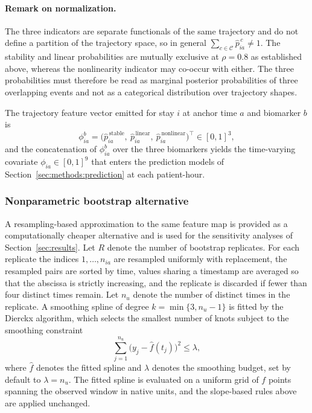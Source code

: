 \paragraph{Remark on normalization.} The three indicators are separate functionals of the same trajectory and do not define a partition of the trajectory space, so in general $\sum_{c\in\mathcal{C}}\hat{p}^{\,c}_{ia}\ne1$. The stability and linear probabilities are mutually exclusive at $\rho=0.8$ as established above, whereas the nonlinearity indicator may co-occur with either. The three probabilities must therefore be read as marginal posterior probabilities of three overlapping events and not as a categorical distribution over trajectory shapes.

The trajectory feature vector emitted for stay $i$ at anchor time $a$ and biomarker $b$ is
$$\phi^b_{ia}=\bigl(\hat{p}^{\,\mathrm{stable}}_{ia},\ \hat{p}^{\,\mathrm{linear}}_{ia},\ \hat{p}^{\,\mathrm{nonlinear}}_{ia}\bigr)^{\top}\in[0,1]^3,$$
and the concatenation of $\phi^b_{ia}$ over the three biomarkers yields the time-varying covariate $\phi_{ia}\in[0,1]^{9}$ that enters the prediction models of Section~\ref{sec:methods:prediction} at each patient-hour.

\subsubsection{Nonparametric bootstrap alternative}
\label{sec:methods:bootstrap}

A resampling-based approximation to the same feature map is provided as a computationally cheaper alternative and is used for the sensitivity analyses of Section~\ref{sec:results}. Let $R$ denote the number of bootstrap replicates. For each replicate the indices $1,\dots,n_{ia}$ are resampled uniformly with replacement, the resampled pairs are sorted by time, values sharing a timestamp are averaged so that the abscissa is strictly increasing, and the replicate is discarded if fewer than four distinct times remain. Let $n_u$ denote the number of distinct times in the replicate. A smoothing spline of degree $k=\min\{3,n_u-1\}$ is fitted by the Dierckx algorithm, which selects the smallest number of knots subject to the smoothing constraint
$$\sum_{j=1}^{n_u}\bigl(y_j-\hat{f}(t_j)\bigr)^2\le\lambda,$$
where $\hat{f}$ denotes the fitted spline and $\lambda$ denotes the smoothing budget, set by default to $\lambda=n_u$. The fitted spline is evaluated on a uniform grid of $f$ points spanning the observed window in native units, and the slope-based rules above are applied unchanged.

